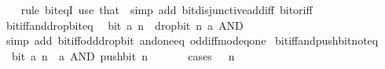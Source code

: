 \begin{isabellebody}
%
\isadelimproof
\ \ %
\endisadelimproof
%
\isatagproof
{}\isamarkupfalse%
\ {\isacharparenleft}{\kern0pt}rule\ bit{\isacharunderscore}{\kern0pt}eqI{\isacharparenright}{\kern0pt}\ {\isacharparenleft}{\kern0pt}use\ that\ \ {\isacartoucheopen}simp\ add{\isacharcolon}{\kern0pt}\ bit{\isacharunderscore}{\kern0pt}disjunctive{\isacharunderscore}{\kern0pt}add{\isacharunderscore}{\kern0pt}iff\ bit{\isacharunderscore}{\kern0pt}or{\isacharunderscore}{\kern0pt}iff{\isacartoucheclose}{\isacharparenright}{\kern0pt}%
\endisatagproof
{\isafoldproof}%
%
\isadelimproof
\isanewline
%
\endisadelimproof
\isanewline
{}\isamarkupfalse%
\ bit{\isacharunderscore}{\kern0pt}iff{\isacharunderscore}{\kern0pt}and{\isacharunderscore}{\kern0pt}drop{\isacharunderscore}{\kern0pt}bit{\isacharunderscore}{\kern0pt}eq{\isacharunderscore}{\kern0pt}{}{\isacharcolon}{\kern0pt}\isanewline
\ \ {\isacartoucheopen}bit\ a\ n\ {\isasymlongleftrightarrow}\ drop{\isacharunderscore}{\kern0pt}bit\ n\ a\ AND\ {}\ {\isacharequal}{\kern0pt}\ {}{\isacartoucheclose}\isanewline
%
\isadelimproof
\ \ %
\endisadelimproof
%
\isatagproof
{}\isamarkupfalse%
\ {\isacharparenleft}{\kern0pt}simp\ add{\isacharcolon}{\kern0pt}\ bit{\isacharunderscore}{\kern0pt}iff{\isacharunderscore}{\kern0pt}odd{\isacharunderscore}{\kern0pt}drop{\isacharunderscore}{\kern0pt}bit\ and{\isacharunderscore}{\kern0pt}one{\isacharunderscore}{\kern0pt}eq\ odd{\isacharunderscore}{\kern0pt}iff{\isacharunderscore}{\kern0pt}mod{\isacharunderscore}{\kern0pt}{}{\isacharunderscore}{\kern0pt}eq{\isacharunderscore}{\kern0pt}one{\isacharparenright}{\kern0pt}%
\endisatagproof
{\isafoldproof}%
%
\isadelimproof
\isanewline
%
\endisadelimproof
\isanewline
{}\isamarkupfalse%
\ bit{\isacharunderscore}{\kern0pt}iff{\isacharunderscore}{\kern0pt}and{\isacharunderscore}{\kern0pt}push{\isacharunderscore}{\kern0pt}bit{\isacharunderscore}{\kern0pt}not{\isacharunderscore}{\kern0pt}eq{\isacharunderscore}{\kern0pt}{}{\isacharcolon}{\kern0pt}\isanewline
\ \ {\isacartoucheopen}bit\ a\ n\ {\isasymlongleftrightarrow}\ a\ AND\ push{\isacharunderscore}{\kern0pt}bit\ n\ {}\ {\isasymnoteq}\ {}{\isacartoucheclose}\isanewline
%
\isadelimproof
\ \ %
\endisadelimproof
%
\isatagproof
{}\isamarkupfalse%
\ {\isacharparenleft}{\kern0pt}cases\ {\isacartoucheopen}{}\ {\isacharcircum}{\kern0pt}\ n\ {\isacharequal}{\kern0pt}\ {}{\isacartoucheclose}{\isacharparenright}{\kern0pt}\isanewline
\ \ \isamarkupfalse%

\end{isabellebody}
